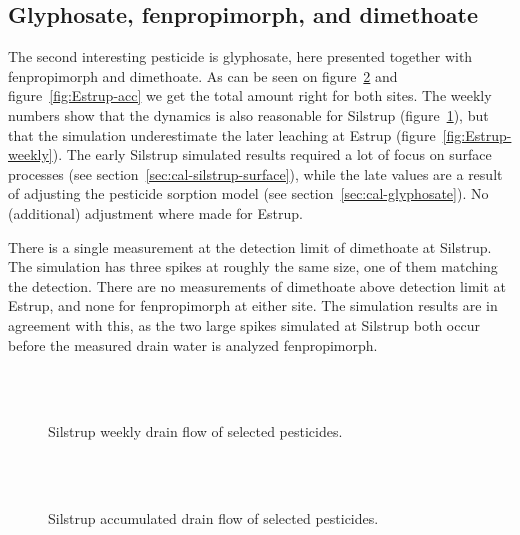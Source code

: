 \FloatBarrier
\subsection{Glyphosate,  fenpropimorph, and dimethoate}

The second interesting pesticide is glyphosate, here presented
together with fenpropimorph and dimethoate.  As can be seen on
figure~\ref{fig:Silstrup-acc} and figure~\ref{fig:Estrup-acc} we get
the total amount right for both sites.  The weekly numbers show that
the dynamics is also reasonable for Silstrup
(figure~\ref{fig:Silstrup-weekly2}), but that the simulation
underestimate the later leaching at Estrup
(figure~\ref{fig:Estrup-weekly}).  The early Silstrup simulated
results required a lot of focus on surface processes (see
section~\ref{sec:cal-silstrup-surface}), while the late values are a
result of adjusting the pesticide sorption model (see
section~\ref{sec:cal-glyphosate}).  No (additional) adjustment where
made for Estrup.

There is a single measurement at the detection limit of dimethoate at
Silstrup.  The simulation has three spikes at roughly the same size,
one of them matching the detection.  There are no measurements of
dimethoate above detection limit at Estrup, and none for fenpropimorph
at either site.  The simulation results are in agreement with this, as
the two large spikes simulated at Silstrup both occur before the
measured drain water is analyzed fenpropimorph.

\begin{figure}[htbp]
  \begin{center}
    \\
    \\
  \end{center}
  \caption{Silstrup weekly drain flow of selected pesticides.}
  \label{fig:Silstrup-weekly2}
\end{figure}

\begin{figure}[htbp]
  \begin{center}
    \\
    \\
  \end{center}
  \caption{Silstrup accumulated drain flow of selected pesticides.}
  \label{fig:Silstrup-acc}
\end{figure}

